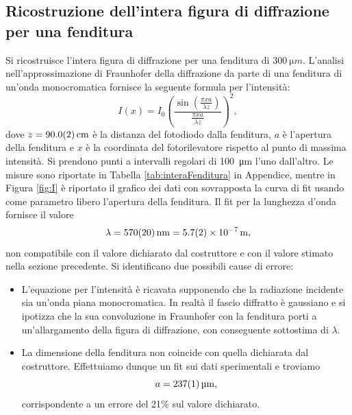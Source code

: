 \documentclass[10pt,oneside,a4paper]{article}
\begin{document}
\begin{multicols}{2}
\section{Ricostruzione dell'intera figura di diffrazione per una fenditura}\label{sec:figura_di_diffrazione}

Si ricostruisce l'intera figura di diffrazione per una fenditura di $\SI{300}{\micro m}$. L'analisi nell'approssimazione di Fraunhofer della diffrazione da parte di una fenditura di un'onda monocromatica fornisce la seguente formula per l'intensità:
\begin{equation}\label{eq:slit_diffraction_figure}
I(x) = I_0\left (\frac{\sin\left(\frac{\pi xa}{\lambda z}\right)}{\frac{\pi xa}{\lambda z}}\right)^2,
\end{equation}
dove $z = \SI{90.0 \pm 0.2}{cm}$ è la distanza del fotodiodo dalla fenditura, $a$ è l'apertura della fenditura e $x$ è la coordinata del fotorilevatore rispetto al punto di massima intensità.
Si prendono punti a intervalli regolari di \SI{100}{\micro m} l'uno dall'altro. Le misure sono riportate in Tabella \ref{tab:interaFenditura} in Appendice, mentre in Figura \ref{fig:I} è riportato il grafico dei dati con sovrapposta la curva di fit usando come parametro libero l'apertura della fenditura. Il fit per la lunghezza d'onda fornisce il valore
\[
 \lambda = \SI{570 \pm 20}{nm} = \SI{5.7 \pm 0.2 e-7}{m},
\]
non compatibile con il valore dichiarato dal costruttore e con il valore stimato nella sezione precedente. Si identificano due possibili cause di errore:
\begin{itemize}[label={-}]
\item L'equazione per l'intensità è ricavata supponendo che la radiazione incidente sia un'onda piana monocromatica. In realtà il fascio diffratto è gaussiano e si ipotizza che la sua convoluzione in Fraunhofer con la fenditura porti a un'allargamento della figura di diffrazione, con conseguente sottostima di $\lambda$.
\item La dimensione della fenditura non coincide con quella dichiarata dal costruttore. Effettuiamo dunque un fit sui dati sperimentali e troviamo $$a = \SI{237 \pm 1}{\micro m},$$ corrispondente a un errore del 21\% sul valore dichiarato.
\end{itemize}


\end{multicols}
\end{document}
